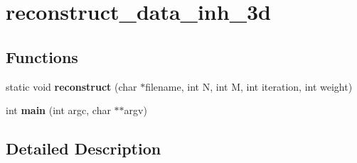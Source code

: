 \hypertarget{group__applications__mri2d__reconstruct__data__inh__3d}{\section{reconstruct\-\_\-data\-\_\-inh\-\_\-3d}
\label{group__applications__mri2d__reconstruct__data__inh__3d}
}
\subsection*{Functions}
\begin{DoxyCompactItemize}
\item 
\hypertarget{group__applications__mri2d__reconstruct__data__inh__3d_ga75582a0ebe96f1391e90db0053ee981c}{static void {\bfseries reconstruct} (char $\ast$filename, int N, int M, int iteration, int weight)}\label{group__applications__mri2d__reconstruct__data__inh__3d_ga75582a0ebe96f1391e90db0053ee981c}

\item 
\hypertarget{group__applications__mri2d__reconstruct__data__inh__3d_ga3c04138a5bfe5d72780bb7e82a18e627}{int {\bfseries main} (int argc, char $\ast$$\ast$argv)}\label{group__applications__mri2d__reconstruct__data__inh__3d_ga3c04138a5bfe5d72780bb7e82a18e627}

\end{DoxyCompactItemize}


\subsection{Detailed Description}

